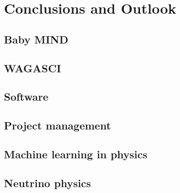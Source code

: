\chapter{Conclusions and Outlook}
\label{c:conclusion}

\section{Baby MIND}

\section{WAGASCI}

\section{Software}

\section{Project management}

\section{Machine learning in physics}

\section{Neutrino physics}



